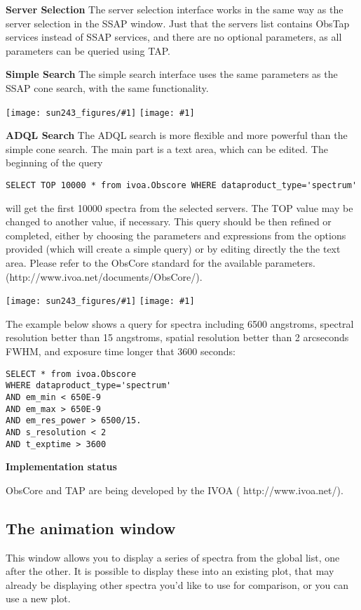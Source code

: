 \documentclass[twoside,11pt,nolof]{starlink}
\providecommand{\mainfigure}[1]
{\begin{center}
    \ifpdf
    \texttt{[image: sun243\_figures/\#1]}
    \else
    \texttt{[image: \#1]}
    \fi
 \end{center}
}
\providecommand{\subheading}[1]{\textbf{\large{#1}}}
\begin{document}
\subheading{Server Selection}
The server selection interface works in the same way as the server selection in the
SSAP window. Just that the servers list contains ObsTap services instead of SSAP services,
and there are no optional parameters, as all parameters can be queried using TAP.

\subheading{Simple Search}
The simple search interface uses the same parameters as the SSAP cone search, with the same
functionality. 

\mainfigure{obscoresimple}

\subheading{ADQL Search}
The ADQL search is more flexible and more powerful than the simple cone search.
The main part is a text area, which can be edited. The beginning of the query
\begin{verbatim}
SELECT TOP 10000 * from ivoa.Obscore WHERE dataproduct_type='spectrum' 
\end{verbatim}
will get the first 10000 spectra from the selected servers. The TOP value may be changed to 
another value, if necessary. This query should be then refined or completed, either by choosing the 
parameters and expressions from the options provided (which will create a simple query) or
by editing directly the  the text area.  Please refer to the ObsCore standard for the available parameters.
(http://www.ivoa.net/documents/ObsCore/).
\mainfigure{obscoreadql}
The example below shows a query for spectra including 6500 angstroms, spectral resolution better than 15 angstroms, spatial 
resolution better than 2 arcseconds FWHM, and exposure time longer that 3600 seconds:
\begin{verbatim}
SELECT * from ivoa.Obscore
WHERE dataproduct_type='spectrum'
AND em_min < 650E-9
AND em_max > 650E-9
AND em_res_power > 6500/15.
AND s_resolution < 2
AND t_exptime > 3600
\end{verbatim}

\subheading{Implementation status}

ObsCore and TAP are  being developed by the IVOA
(
{http://www.ivoa.net/}).


\newpage
\subsection{The animation window}

This window allows you to display a series of spectra from the global list,
one after the other. It is possible to display these into an existing plot,
that may already be displaying other spectra you'd like to use for comparison,
or you can use a new plot.
\end{document}
